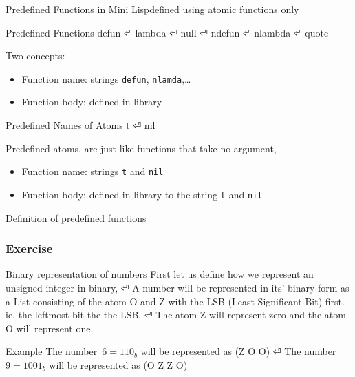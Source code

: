 \documentclass[fleqn]{beamer}
\begin{document}
\begin{frame}{Predefined Functions in Mini Lisp}{defined using atomic functions only}
\begin{block}{Predefined Functions}
  defun ⏎
  lambda ⏎
  null ⏎
  ndefun ⏎
  nlambda ⏎
  quote
\end{block}
Two concepts:
\begin{itemize}
  \item Function name: strings \texttt{defun}, \texttt{nlamda},…
  \item Function body: defined in library
\end{itemize}
\pause
\begin{block}{Predefined Names of Atoms}
  t ⏎
  nil
\end{block}
Predefined atoms, are just like functions that take no argument,
\begin{itemize}
  \item Function name: strings \texttt{t} and \texttt{nil}
  \item Function body: defined in library to the string \texttt{t} and \texttt{nil}
\end{itemize}
\end{frame}

\begin{frame}{Definition of predefined functions}
\begin{LTR}
  
\end{LTR}
\end{frame}

\begin{frame}
\frametitle{Exercise}
\begin{block}{Binary representation of numbers}
  First let us define how we represent an unsigned integer in binary, ⏎
  A number will be represented in its' binary form as a List consisting of the atom O and Z with the LSB (Least Significant Bit) first. ie. the leftmost bit the the LSB. ⏎
  The atom Z will represent zero and the atom O will represent one.
\end{block}

\begin{block}{Example}
  The number~$6={110}_b$ will be represented as (Z O O) ⏎
  The number~$9={1001}_b$ will be represented as (O Z Z O)
\end{block}
\end{frame}
\end{document}
